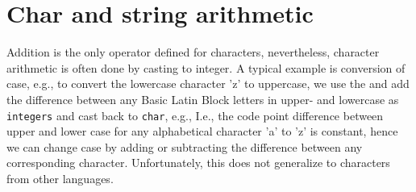 \section{Char and string arithmetic}
Addition is the only operator defined for characters, nevertheless, character arithmetic is often done by casting to integer. A typical example is conversion of case, e.g., to convert the lowercase character 'z' to uppercase, we use the  and add the difference between any Basic Latin Block letters in upper- and lowercase as \lstinline{integers} and cast back to \lstinline{char}, e.g.,
%
%
I.e., the code point difference between upper and lower case for any alphabetical character 'a' to 'z' is constant, hence we can change case by adding or subtracting the difference between any corresponding character. Unfortunately, this does not generalize to characters from other languages.

